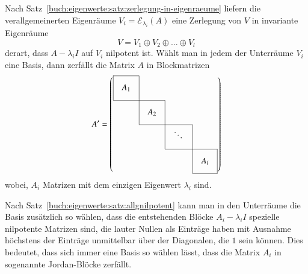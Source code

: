 Nach Satz~\ref{buch:eigenwerte:satz:zerlegung-in-eigenraeume} liefern
die verallgemeinerten Eigenräume $V_i=\mathcal{E}_{\lambda_i}(A)$ eine
%
Zerlegung von $V$ in invariante Eigenräume
\[
V=V_1\oplus V_2\oplus \dots\oplus V_l
\]
derart, dass $A-\lambda_iI$ auf $V_i$ nilpotent ist.
Wählt man in jedem der Unterräume $V_i$ eine Basis, dann zerfällt die
Matrix $A$ in Blockmatrizen
\begin{equation}
\def\temp#1{\multicolumn{1}{|c}{\raisebox{0pt}[17pt][12pt]{\phantom{x}$#1\mathstrut$}\phantom{x}}}
A'
=\left(
\begin{array}{cccc}
\cline{1-1}
\temp{A_{1}} &\multicolumn{1}{|c}{}&        &           \\
\cline{1-2}
          &\temp{A_{2}}&\multicolumn{1}{|c}{}&           \\
\cline{2-3}
          &           &\temp{\ddots}&\multicolumn{1}{|c}{}\\
\cline{3-4}
          &           &        &\multicolumn{1}{|c|}{\raisebox{0pt}[17pt][12pt]{\phantom{x}$A_{l}$}\phantom{x}}\\
\cline{4-4}
\end{array}
\right)
\label{buch:eigenwerte:eqn:allgjordan}
\end{equation}
wobei, $A_i$ Matrizen mit dem einzigen Eigenwert $\lambda_i$ sind.

Nach Satz~\ref{buch:eigenwerte:satz:allgnilpotent}
kann man in den Unterräume die Basis zusätzlich so wählen, dass 
die entstehenden Blöcke $A_i-\lambda_i I$ spezielle nilpotente Matrizen sind,
die lauter Nullen als Einträge haben mit Ausnahme 
höchstens der Einträge unmittelbar über der Diagonalen, die $1$ sein können.
Dies bedeutet, dass sich immer eine Basis so wählen lässt, dass die
Matrix $A_i$ in sogenannte Jordan-Blöcke zerfällt.

